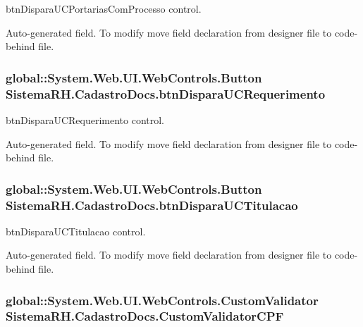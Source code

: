 btnDisparaUCPortariasComProcesso control. 

Auto-\/generated field. To modify move field declaration from designer file to code-\/behind file. \hypertarget{class_sistema_r_h_1_1_cadastro_docs_a94141c28be0fcc27009e5bb894ca0568}{
\subsubsection[{btnDisparaUCRequerimento}]{\setlength{\rightskip}{0pt plus 5cm}global::System.Web.UI.WebControls.Button {\bf SistemaRH.CadastroDocs.btnDisparaUCRequerimento}}}
\label{class_sistema_r_h_1_1_cadastro_docs_a94141c28be0fcc27009e5bb894ca0568}


btnDisparaUCRequerimento control. 

Auto-\/generated field. To modify move field declaration from designer file to code-\/behind file. \hypertarget{class_sistema_r_h_1_1_cadastro_docs_afa84dbdf065cac183b6b3c84949bc0e5}{
\subsubsection[{btnDisparaUCTitulacao}]{\setlength{\rightskip}{0pt plus 5cm}global::System.Web.UI.WebControls.Button {\bf SistemaRH.CadastroDocs.btnDisparaUCTitulacao}}}
\label{class_sistema_r_h_1_1_cadastro_docs_afa84dbdf065cac183b6b3c84949bc0e5}


btnDisparaUCTitulacao control. 

Auto-\/generated field. To modify move field declaration from designer file to code-\/behind file. \hypertarget{class_sistema_r_h_1_1_cadastro_docs_a6eba4bc5c40034a547b489b7bd86e717}{
\subsubsection[{CustomValidatorCPF}]{\setlength{\rightskip}{0pt plus 5cm}global::System.Web.UI.WebControls.CustomValidator {\bf SistemaRH.CadastroDocs.CustomValidatorCPF}}}
\label{class_sistema_r_h_1_1_cadastro_docs_a6eba4bc5c40034a547b489b7bd86e717}


